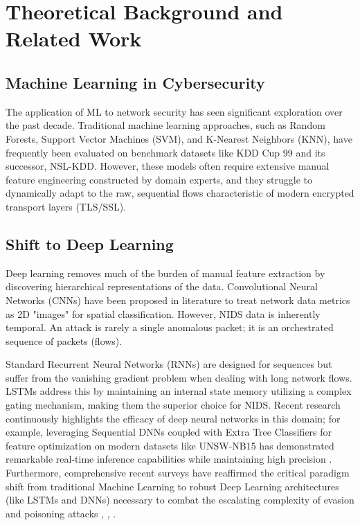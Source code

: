 \documentclass[conference]{IEEEtran}
\begin{document}
\section{Theoretical Background and Related Work}

\subsection{Machine Learning in Cybersecurity}
The application of ML to network security has seen significant exploration over the past decade. Traditional machine learning approaches, such as Random Forests, Support Vector Machines (SVM), and K-Nearest Neighbors (KNN), have frequently been evaluated on benchmark datasets like KDD Cup 99 and its successor, NSL-KDD. However, these models often require extensive manual feature engineering constructed by domain experts, and they struggle to dynamically adapt to the raw, sequential flows characteristic of modern encrypted transport layers (TLS/SSL).

\subsection{Shift to Deep Learning}
Deep learning removes much of the burden of manual feature extraction by discovering hierarchical representations of the data. Convolutional Neural Networks (CNNs) have been proposed in literature to treat network data metrics as 2D "images" for spatial classification. However, NIDS data is inherently temporal. An attack is rarely a single anomalous packet; it is an orchestrated sequence of packets (flows). 

Standard Recurrent Neural Networks (RNNs) are designed for sequences but suffer from the vanishing gradient problem when dealing with long network flows. LSTMs address this by maintaining an internal state memory utilizing a complex gating mechanism, making them the superior choice for NIDS. Recent research continuously highlights the efficacy of deep neural networks in this domain; for example, leveraging Sequential DNNs coupled with Extra Tree Classifiers for feature optimization on modern datasets like UNSW-NB15 has demonstrated remarkable real-time inference capabilities while maintaining high precision \cite{nature2025dnn}. Furthermore, comprehensive recent surveys have reaffirmed the critical paradigm shift from traditional Machine Learning to robust Deep Learning architectures (like LSTMs and DNNs) necessary to combat the escalating complexity of evasion and poisoning attacks \cite{springer2025survey}, \cite{mdpi2025ids}, \cite{sciencedirect2025ids}.
\end{document}
